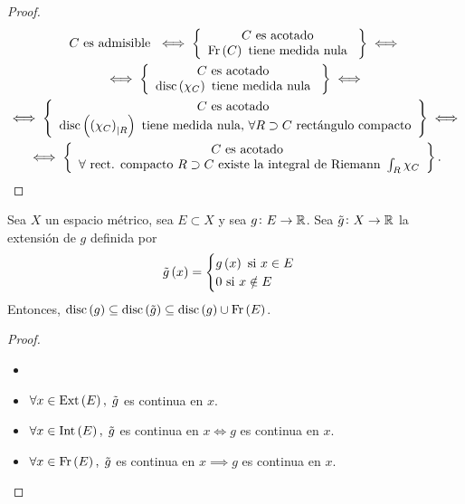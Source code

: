 \begin{proof}
    \begin{gather*}
        C \text{ es admisible } \iff \left\{ \begin{array}{c}
            C \text{ es acotado } \\
            \operatorname{Fr} \left( C \right) \text{ tiene medida nula }
        \end{array} \right\} \iff \\
            \iff \left\{ \begin{array}{c}
            C \text{ es acotado } \\
            \operatorname{disc} \left( \chi_C \right) \text{ tiene medida nula }
        \end{array} \right\} \iff \\
        \iff \left\{ \begin{array}{c}
            C \text{ es acotado } \\
            \operatorname{disc} \left( \left( \chi_C \right) _{|R} \right) \text{ tiene medida nula, } \forall R\supset C \text{ rectángulo compacto}
        \end{array} \right\} \iff \\
        \iff \left\{ \begin{array}{c}
            C \text{ es acotado } \\
            \forall \text{ rect. compacto } R \supset C \text{ existe la integral de Riemann } \int_R \chi_C
        \end{array} \right\}.
    \end{gather*}
\end{proof}
\begin{lema} \label{lema_2_4_9}
    Sea $X$ un espacio métrico, sea $E \subset X$ y sea $g \colon E \to \mathbb{R}$. Sea $\tilde{g} \colon X \to \mathbb{R}$ la extensión de $g$ definida por
    \[
        \tilde{g} \left( x \right) = \begin{cases} g \left( x \right) \text{ si } x \in E \\ 0 \text{ si } x \notin E \end{cases}
    \]
    Entonces, $\operatorname{disc} \left( g \right) \subseteq \operatorname{disc} \left( \tilde{g} \right) \subseteq \operatorname{disc} \left( g \right) \cup \operatorname{Fr} \left( E \right)$.
\end{lema}
\begin{proof}
    \begin{itemize} \item[]
        \item $\forall x \in \operatorname{Ext} \left( E \right), \; \tilde{g}$ es continua en $x$.
        \item $\forall x \in \operatorname{Int} \left( E \right), \; \tilde{g}$ es continua en $x \iff g$ es continua en $x $.
        \item $\forall x \in \operatorname{Fr} \left( E \right), \; \tilde{g}$ es continua en $x \implies g$ es continua en $x $.
    \end{itemize}
\end{proof}
